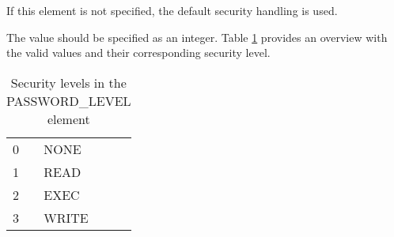 \documentclass[a4paper]{book}
\newcommand{\vs}{\vspace{3mm}}
\begin{document}
If this element is not specified, the default security handling is used.

\vs

The value should be specified as an integer. Table \ref{tab:seclevelint}
provides an overview with the valid values and their corresponding security level.

\begin{table}[ht]
\begin{minipage}[t]{\textwidth}
\begin{tabular}{ll}\hline
0 & NONE \\
1 & READ \\
2 & EXEC \\
3 & WRITE \\ \hline
\end{tabular} \newline 
\caption{Security levels in the PASSWORD{\_}LEVEL element}\label{tab:seclevelint}
\end{minipage}
\end{table}
\end{document}
